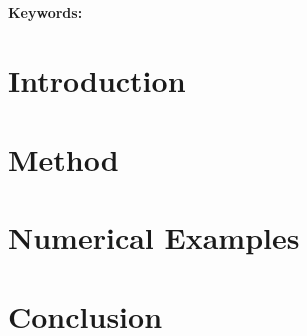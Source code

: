 \documentclass{article}
\begin{document}
\title{}

\author{
}
\date{\today}

\maketitle

\begin{center}
  \footnotesize
\end{center}

\begin{abstract}

\end{abstract}

\paragraph{Keywords:} %

\newpage
\section{Introduction}

\section{Method}

\section{Numerical Examples}




\section{Conclusion}



\end{document}
